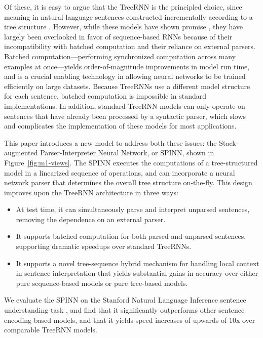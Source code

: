 \documentclass[11pt]{article}
\begin{document}
Of these, it is easy to argue that the TreeRNN is the principled choice, since meaning in natural language sentences constructed incrementally according to a tree structure \citep{Partee84,Janssen97}. However, while these models have shown promise \citep{tai2015improved,li2015tree,bowman2015trees}, they have largely been overlooked in favor of sequence-based RNNs because of their incompatibility with batched computation and their reliance on external parsers.  Batched computation---performing synchronized computation across many examples at once---yields order-of-magnitude improvements in model run time, and is a crucial enabling technology in allowing neural networks to be trained efficiently on large datasets. Because TreeRNNs use a different model structure for each sentence, batched computation is impossible in standard implementations. In addition, standard TreeRNN models can only operate on sentences that have already been processed by a syntactic parser, which slows and complicates the implementation of these models for most applications.

This paper introduces a new model to address both these issues: the Stack-augmented Parser-Interpreter Neural Network, or SPINN, shown in Figure~\ref{fig:m1-views}. The SPINN executes the computations of a tree-structured model in a linearized sequence of operations, and can incorporate a neural network parser that determines the overall tree structure on-the-fly. This design improves upon the TreeRNN architecture in three ways:
\begin{itemize}
\item At test time, it can simultaneously parse and interpret unparsed sentences, removing the dependence on an external parser.
\item It supports batched computation for both parsed and unparsed sentences, supporting dramatic speedups over standard TreeRNNs.
\item It supports a novel tree-sequence hybrid mechanism for handling local context in sentence interpretation that yields substantial gains in accuracy over either pure sequence-based models or pure tree-based models.
\end{itemize}

We evaluate the SPINN on the Stanford Natural Language Inference sentence understanding task \citep[SNLI,][]{snli:emnlp2015}, and find that it significantly outperforms other sentence encoding-based models, and that it yields speed increases of upwards of 10x over comparable TreeRNN models.
\end{document}
